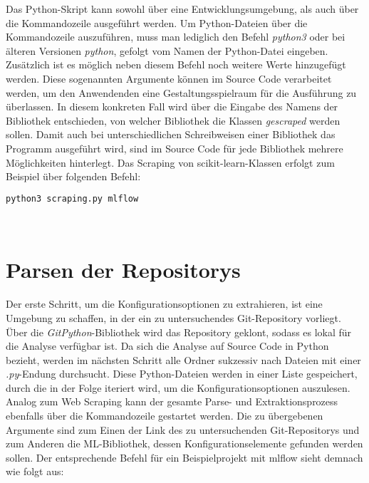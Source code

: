 \documentclass[german,bachelor]{swsLeipzig}
\begin{document}
Das Python-Skript kann sowohl über eine Entwicklungsumgebung, als auch über die Kommandozeile ausgeführt werden.
Um Python-Dateien über die Kommandozeile auszuführen, muss man lediglich den Befehl \textit{python3} oder bei älteren
Versionen \textit{python}, gefolgt vom Namen der Python-Datei eingeben.
Zusätzlich ist es möglich neben diesem Befehl noch weitere Werte hinzugefügt werden.
Diese sogenannten Argumente können im Source Code verarbeitet werden, um den Anwendenden eine Gestaltungsspielraum für
die Ausführung zu überlassen.
In diesem konkreten Fall wird über die Eingabe des Namens der Bibliothek entschieden, von welcher Bibliothek die
Klassen  \textit{gescraped} werden sollen.
Damit auch bei unterschiedlichen Schreibweisen einer Bibliothek das Programm ausgeführt wird, sind im Source Code für jede
Bibliothek mehrere Möglichkeiten hinterlegt.
Das Scraping von scikit-learn-Klassen erfolgt zum Beispiel über folgenden Befehl:\\

\noindent\begin{minipage}{\linewidth}
\begin{lstlisting}[language=bash, frame=single, label=scraping_scikit-learn, basicstyle=\small, caption={Kommandozeilenbefehl für das Web Scraping von scikit-learn},captionpos=b]
python3 scraping.py mlflow
\end{lstlisting}
\end{minipage}
\

\section{Parsen der Repositorys}
Der erste Schritt, um die Konfigurationsoptionen zu extrahieren, ist eine Umgebung zu schaffen, in der ein zu untersuchendes
Git-Repository vorliegt.
Über die \textit{GitPython}-Bibliothek wird das Repository geklont, sodass es lokal für die Analyse verfügbar ist.
Da sich die Analyse auf Source Code in Python bezieht, werden im nächsten Schritt alle Ordner sukzessiv nach Dateien mit
einer \textit{.py}-Endung durchsucht.
Diese Python-Dateien werden in einer Liste gespeichert, durch die in der Folge iteriert wird, um die Konfigurationsoptionen auszulesen. \\

Analog zum Web Scraping kann der gesamte Parse- und Extraktionsprozess ebenfalls über die Kommandozeile gestartet werden.
Die zu übergebenen Argumente sind zum Einen der Link des zu untersuchenden Git-Repositorys und zum Anderen die ML-Bibliothek, dessen
Konfigurationselemente gefunden werden sollen.
Der entsprechende Befehl für ein Beispielprojekt mit mlflow sieht demnach wie folgt aus: \\
\end{document}
